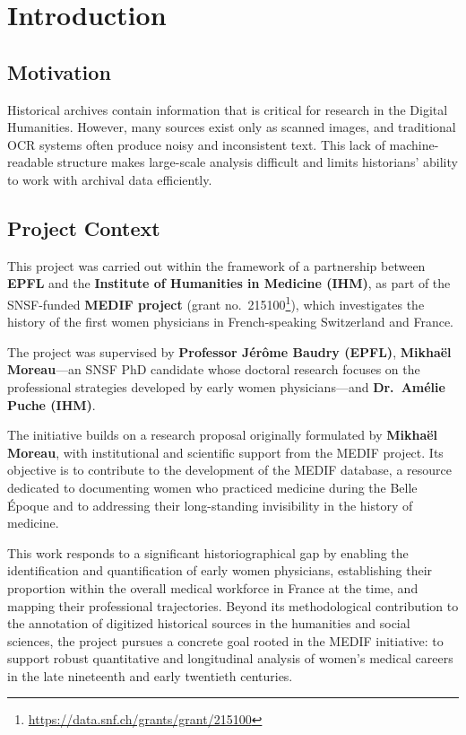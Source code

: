 \chapter{Introduction}
\section{Motivation}

Historical archives contain information that is critical for research in the Digital Humanities. However, many sources exist only as scanned images, and traditional OCR systems often produce noisy and inconsistent text. This lack of machine-readable structure makes large-scale analysis difficult and limits historians’ ability to work with archival data efficiently.

\section{Project Context}

This project was carried out within the framework of a partnership between \textbf{EPFL} and the \textbf{Institute of Humanities in Medicine (IHM)}, as part of the SNSF-funded \textbf{MEDIF project} (grant no.~215100\footnote{\url{https://data.snf.ch/grants/grant/215100}}), which investigates the history of the first women physicians in French-speaking Switzerland and France.

The project was supervised by \textbf{Professor Jérôme Baudry (EPFL)}, \textbf{Mikhaël Moreau}—an SNSF PhD candidate whose doctoral research focuses on the professional strategies developed by early women physicians—and \textbf{Dr.\ Amélie Puche (IHM)}. 

The initiative builds on a research proposal originally formulated by \textbf{Mikhaël Moreau}, with institutional and scientific support from the MEDIF project. Its objective is to contribute to the development of the MEDIF database, a resource dedicated to documenting women who practiced medicine during the Belle Époque and to addressing their long-standing invisibility in the history of medicine.

This work responds to a significant historiographical gap by enabling the identification and quantification of early women physicians, establishing their proportion within the overall medical workforce in France at the time, and mapping their professional trajectories. Beyond its methodological contribution to the annotation of digitized historical sources in the humanities and social sciences, the project pursues a concrete goal rooted in the MEDIF initiative: to support robust quantitative and longitudinal analysis of women’s medical careers in the late nineteenth and early twentieth centuries.

